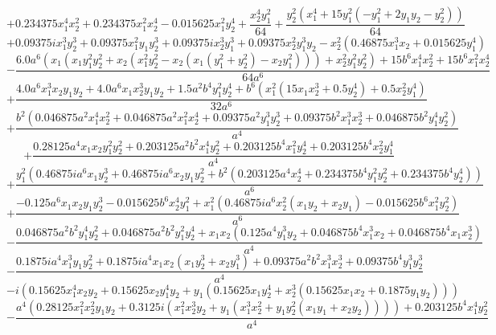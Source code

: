 $$+0.234375 x_{1}^{4} x_{2}^{2} + 0.234375 x_{1}^{2} x_{2}^{4} - 0.015625 x_{1}^{2} y_{2}^{4} + \frac{x_{2}^{4} y_{1}^{2}}{64} + \frac{y_{2}^{2} \left(x_{1}^{4} + 15 y_{1}^{2} \left(- y_{1}^{2} + 2 y_{1} y_{2} - y_{2}^{2}\right)\right)}{64}$$
$$+0.09375 i x_{1}^{3} y_{2}^{3} + 0.09375 x_{1}^{2} y_{1} y_{2}^{3} + 0.09375 i x_{2}^{3} y_{1}^{3} + 0.09375 x_{2}^{2} y_{1}^{3} y_{2} - x_{2}^{2} \left(0.46875 x_{1}^{3} x_{2} + 0.015625 y_{1}^{4}\right)$$
$$- \frac{6.0 a^{6} \left(x_{1} \left(x_{1} y_{1}^{2} y_{2}^{2} + x_{2} \left(x_{1}^{2} y_{2}^{2} - x_{2} \left(x_{1} \left(y_{1}^{2} + y_{2}^{2}\right) - x_{2} y_{1}^{2}\right)\right)\right) + x_{2}^{2} y_{1}^{2} y_{2}^{2}\right) + 15 b^{6} x_{1}^{4} x_{2}^{2} + 15 b^{6} x_{1}^{2} x_{2}^{4}}{64 a^{6}}$$
$$+\frac{4.0 a^{6} x_{1}^{3} x_{2} y_{1} y_{2} + 4.0 a^{6} x_{1} x_{2}^{3} y_{1} y_{2} + 1.5 a^{2} b^{4} y_{1}^{2} y_{2}^{4} + b^{6} \left(x_{1}^{2} \left(15 x_{1} x_{2}^{3} + 0.5 y_{2}^{4}\right) + 0.5 x_{2}^{2} y_{1}^{4}\right)}{32 a^{6}}$$
$$+\frac{b^{2} \left(0.046875 a^{2} x_{1}^{4} x_{2}^{2} + 0.046875 a^{2} x_{1}^{2} x_{2}^{4} + 0.09375 a^{2} y_{1}^{3} y_{2}^{3} + 0.09375 b^{2} x_{1}^{3} x_{2}^{3} + 0.046875 b^{2} y_{1}^{4} y_{2}^{2}\right)}{a^{4}}$$
$$+\frac{0.28125 a^{4} x_{1} x_{2} y_{1}^{2} y_{2}^{2} + 0.203125 a^{2} b^{2} x_{1}^{4} y_{2}^{2} + 0.203125 b^{4} x_{1}^{2} y_{2}^{4} + 0.203125 b^{4} x_{2}^{2} y_{1}^{4}}{a^{4}}$$
$$+\frac{y_{1}^{2} \left(0.46875 i a^{6} x_{1} y_{2}^{3} + 0.46875 i a^{6} x_{2} y_{1} y_{2}^{2} + b^{2} \left(0.203125 a^{4} x_{2}^{4} + 0.234375 b^{4} y_{1}^{2} y_{2}^{2} + 0.234375 b^{4} y_{2}^{4}\right)\right)}{a^{6}}$$
$$+\frac{- 0.125 a^{6} x_{1} x_{2} y_{1} y_{2}^{3} - 0.015625 b^{6} x_{2}^{4} y_{1}^{2} + x_{1}^{2} \left(0.46875 i a^{6} x_{2}^{2} \left(x_{1} y_{2} + x_{2} y_{1}\right) - 0.015625 b^{6} x_{1}^{2} y_{2}^{2}\right)}{a^{6}}$$
$$- \frac{0.046875 a^{2} b^{2} y_{1}^{4} y_{2}^{2} + 0.046875 a^{2} b^{2} y_{1}^{2} y_{2}^{4} + x_{1} x_{2} \left(0.125 a^{4} y_{1}^{3} y_{2} + 0.046875 b^{4} x_{1}^{3} x_{2} + 0.046875 b^{4} x_{1} x_{2}^{3}\right)}{a^{4}}$$
$$- \frac{0.1875 i a^{4} x_{1}^{3} y_{1} y_{2}^{2} + 0.1875 i a^{4} x_{1} x_{2} \left(x_{1} y_{2}^{3} + x_{2} y_{1}^{3}\right) + 0.09375 a^{2} b^{2} x_{1}^{3} x_{2}^{3} + 0.09375 b^{4} y_{1}^{3} y_{2}^{3}}{a^{4}}$$
$$- i \left(0.15625 x_{1}^{4} x_{2} y_{2} + 0.15625 x_{2} y_{1}^{4} y_{2} + y_{1} \left(0.15625 x_{1} y_{2}^{4} + x_{2}^{3} \left(0.15625 x_{1} x_{2} + 0.1875 y_{1} y_{2}\right)\right)\right)$$
$$- \frac{a^{4} \left(0.28125 x_{1}^{2} x_{2}^{2} y_{1} y_{2} + 0.3125 i \left(x_{1}^{2} x_{2}^{3} y_{2} + y_{1} \left(x_{1}^{3} x_{2}^{2} + y_{1} y_{2}^{2} \left(x_{1} y_{1} + x_{2} y_{2}\right)\right)\right)\right) + 0.203125 b^{4} x_{1}^{4} y_{2}^{2}}{a^{4}}$$
